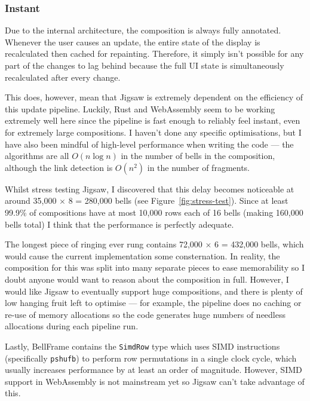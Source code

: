 \documentclass[12pt]{article}
\begin{document}
\subsubsection{Instant}

Due to the internal architecture, the composition is always fully annotated.  Whenever the user
causes an update, the entire state of the display is recalculated then cached for repainting.
Therefore, it simply isn't possible for any part of the changes to lag behind because the full UI
state is simultaneously recalculated after every change.

This does, however, mean that Jigsaw is extremely dependent on the efficiency of this update
pipeline.  Luckily, Rust and WebAssembly seem to be working extremely well here since the pipeline
is fast enough to reliably feel instant, even for extremely large compositions.  I haven't done any
specific optimisations, but I have also been mindful of high-level performance when writing the code
--- the algorithms are all $O(n \log n)$ in the number of bells in the composition, although the
link detection is $O(n^2)$ in the number of fragments.

Whilst stress testing Jigsaw, I discovered that this delay becomes noticeable at around 35,000
$\times$ 8 = 280,000 bells (see Figure~\ref{fig:stress-test}).  Since at least 99.9\% of
compositions have at most 10,000 rows each of 16 bells (making 160,000 bells total) I think that the
performance is perfectly adequate.

The longest piece of ringing ever rung contains 72,000 $\times$ 6 = 432,000 bells, which would cause
the current implementation some consternation.  In reality, the composition for this was split into
many separate pieces to ease memorability so I doubt anyone would want to reason about the
composition in full.  However, I would like Jigsaw to eventually support huge compositions, and
there is plenty of low hanging fruit left to optimise --- for example, the pipeline does no caching
or re-use of memory allocations so the code generates huge numbers of needless allocations during
each pipeline run.

Lastly, BellFrame contains the \verb|SimdRow| type which uses SIMD instructions
(specifically \verb|pshufb|) to perform row permutations in a single clock cycle, which usually
increases performance by at least an order of magnitude.  However, SIMD support in WebAssembly is
not mainstream yet so Jigsaw can't take advantage of this.
\end{document}
